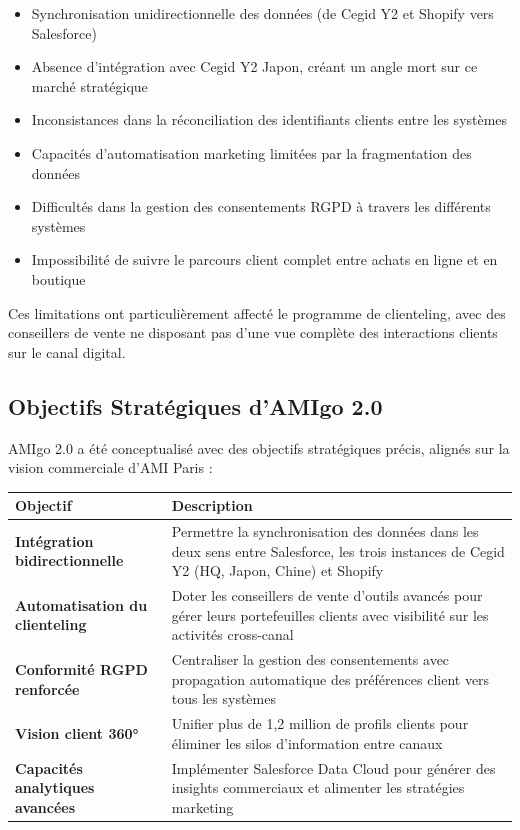 \begin{itemize}
    \item Synchronisation unidirectionnelle des données (de Cegid Y2 et Shopify vers Salesforce)
    \item Absence d'intégration avec Cegid Y2 Japon, créant un angle mort sur ce marché stratégique
    \item Inconsistances dans la réconciliation des identifiants clients entre les systèmes
    \item Capacités d'automatisation marketing limitées par la fragmentation des données
    \item Difficultés dans la gestion des consentements RGPD à travers les différents systèmes
    \item Impossibilité de suivre le parcours client complet entre achats en ligne et en boutique
\end{itemize}

Ces limitations ont particulièrement affecté le programme de clienteling, avec des conseillers de vente ne disposant pas d'une vue complète des interactions clients sur le canal digital.

\subsection{Objectifs Stratégiques d'AMIgo 2.0}

AMIgo 2.0 a été conceptualisé avec des objectifs stratégiques précis, alignés sur la vision commerciale d'AMI Paris :

\begin{center}
\begin{tabular}{|>{\bfseries}p{3.5cm}|p{10cm}|}
\hline
\rowcolor{lightblue} Objectif & Description \\
\hline
Intégration bidirectionnelle & Permettre la synchronisation des données dans les deux sens entre Salesforce, les trois instances de Cegid Y2 (HQ, Japon, Chine) et Shopify \\
\hline
Automatisation du clienteling & Doter les conseillers de vente d'outils avancés pour gérer leurs portefeuilles clients avec visibilité sur les activités cross-canal \\
\hline
Conformité RGPD renforcée & Centraliser la gestion des consentements avec propagation automatique des préférences client vers tous les systèmes \\
\hline
Vision client 360° & Unifier plus de 1,2 million de profils clients pour éliminer les silos d'information entre canaux \\
\hline
Capacités analytiques avancées & Implémenter Salesforce Data Cloud pour générer des insights commerciaux et alimenter les stratégies marketing \\
\hline
\end{tabular}
\end{center}

